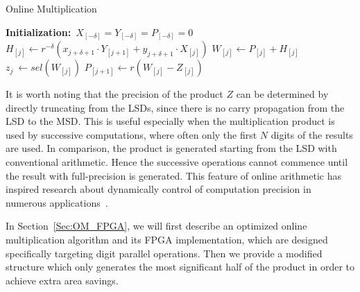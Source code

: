 \documentclass[conference]{IEEEtran}
\begin{document}
\begin{algorithm}[tbp]
  \caption{Online Multiplication}  \label{Algorithm:OnlineMult}
  \begin{algorithmic}[1]
   \State \textbf{Initialization:}~$X_{[-\delta]}=Y_{[-\delta]}=P_{[-\delta]}=0$\vspace{.5ex}
    \vspace{.5ex}
        \State $H_{[j]} \leftarrow r^{-\delta}\left(x_{j+\delta+1}\cdot Y_{[j+1]}+y_{j+\delta+1}\cdot X_{[j]}\right)$\vspace{.5ex}
        \State $W_{[j]} \leftarrow P_{[j]} + H_{[j]}$\vspace{.5ex}
        \State $z_{j}~ \leftarrow sel(W_{[j]})$\vspace{.5ex}
        \State $P_{[j+1]} \leftarrow r\left(W_{[j]}-Z_{[j]}\right)$\vspace{.5ex}
    \EndFor
  \end{algorithmic}
\end{algorithm}
\vspace{-1.5ex}


It is worth noting that the precision of the product $Z$ can be determined by directly truncating from the LSDs, since there is no carry propagation from the LSD to the MSD. This is useful especially when the multiplication product is used by successive computations, where often only the first $N$ digits of the results are used. In comparison, the product is generated starting from the LSD with conventional arithmetic. Hence the successive operations cannot commence until the result with full-precision is generated. This feature of online arithmetic has inspired research about dynamically control of computation precision in numerous applications~\cite{Online_Truncation}.\vspace{-0.5ex}


In Section~\ref{Sec:OM_FPGA}, we will first describe an optimized online multiplication algorithm and its FPGA implementation, which are designed specifically targeting digit parallel operations. Then we provide a modified structure which only generates the most significant half of the product in order to achieve extra area savings.\vspace{-0.5ex}

\end{document}
